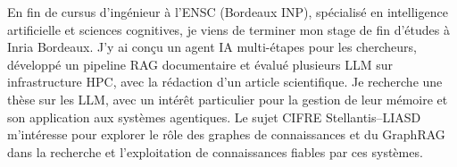 
\begin{cvparagraph}
En fin de cursus d’ingénieur à l’ENSC (Bordeaux INP), spécialisé en intelligence artificielle et sciences cognitives, je viens de terminer mon stage de fin d’études à Inria Bordeaux. J’y ai conçu un agent IA multi-étapes pour les chercheurs, développé un pipeline RAG documentaire et évalué plusieurs LLM sur infrastructure HPC, avec la rédaction d’un article scientifique. Je recherche une thèse sur les LLM, avec un intérêt particulier pour la gestion de leur mémoire et son application aux systèmes agentiques. Le sujet CIFRE Stellantis--LIASD m’intéresse pour explorer le rôle des graphes de connaissances et du GraphRAG dans la recherche et l’exploitation de connaissances fiables par ces systèmes.
\end{cvparagraph}
